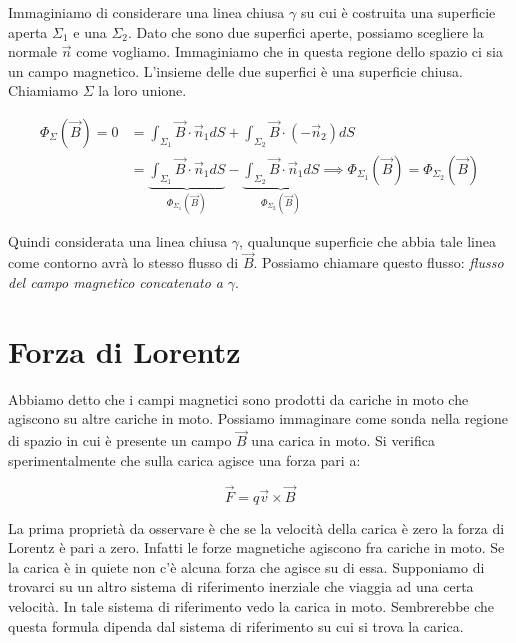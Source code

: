 Immaginiamo di considerare una linea chiusa $\gamma$ su cui è costruita una superficie aperta $\Sigma_1$ e una $\Sigma_2$. Dato che sono due superfici aperte, possiamo scegliere la normale $\vec{n}$ come vogliamo. Immaginiamo che in questa regione dello spazio ci sia un campo magnetico. L'insieme delle due superfici è una superficie chiusa. Chiamiamo $\Sigma$ la loro unione.

\begin{equation*}
	\begin{aligned}
		\Phi_{\Sigma} (\vec{B} ) = 0 &= \int_{\Sigma_1}\vec{B} \cdot \vec{n}_1  dS + \int_{\Sigma_2}\vec{B} \cdot (-\vec{n}_2)dS \\
		&= \underbrace{\int_{\Sigma_1}\vec{B} \cdot \vec{n}_1  dS}_{\Phi_{\Sigma_1}(\vec{B} )}  - \underbrace{\int_{\Sigma_2}\vec{B} \cdot \vec{n}_1 dS}_{\Phi_{\Sigma_2}(\vec{B} )}  \implies \Phi_{\Sigma_1}(\vec{B} ) = \Phi_{\Sigma_2}(\vec{B} )
	\end{aligned}
\end{equation*}

Quindi considerata una linea chiusa $\gamma$, qualunque superficie che abbia tale linea come contorno avrà lo stesso flusso di $\vec{B}$.
Possiamo chiamare questo flusso: \emph{flusso del campo magnetico concatenato a} $\gamma$.

\section{Forza di Lorentz}

Abbiamo detto che i campi magnetici sono prodotti da cariche in moto che agiscono su altre cariche in moto. Possiamo immaginare come sonda nella regione di spazio in cui è presente un campo $\vec{B}$ una carica in moto.
Si verifica sperimentalmente che sulla carica agisce una forza pari a:

\[
	\boxed{\vec{F} = q\vec{v} \times \vec{B}}
\]

La prima proprietà da osservare è che se la velocità della carica
è zero la forza di Lorentz è pari a zero. Infatti le forze magnetiche agiscono fra cariche in moto. Se la carica è in quiete non c'è alcuna forza che agisce su di essa. Supponiamo di trovarci su un altro sistema di riferimento inerziale che viaggia ad una certa velocità. In tale sistema di riferimento vedo la carica in moto. Sembrerebbe che questa formula dipenda dal sistema di riferimento su cui si trova la carica.


